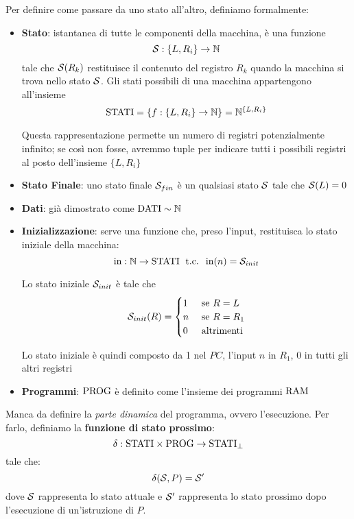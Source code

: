Per definire come passare da uno stato all'altro, definiamo formalmente: 
\begin{itemize}
	\item \textbf{Stato}: istantanea di tutte le componenti della macchina, è una funzione 
	$$ \mathcal{S}: \{L, R_i\} \rightarrow \mathbb{N} $$
	tale che $\mathcal{S} (R_k)$ restituisce il contenuto del registro $R_k$ quando la macchina si trova nello stato $\mathcal{S}$. Gli stati possibili di una macchina appartengono all'insieme 
	$$ \text{STATI} = \{f: \{L, R_i\} \rightarrow \mathbb{N}\} = \mathbb{N}^{\{L,R_i\}} $$
	
    Questa rappresentazione permette un numero di registri potenzialmente infinito; se così non fosse, avremmo tuple per indicare tutti i possibili registri al posto dell'insieme $\{L,R_i\}$

	\item \textbf{Stato Finale}: uno stato finale $\mathcal{S}_{fin}$ è un qualsiasi stato $\mathcal{S}$ tale che $\mathcal{S} (L) = 0$
	
    \item \textbf{Dati}: già dimostrato come $\text{DATI} \sim \mathbb{N}$
	
    \item \textbf{Inizializzazione}: serve una funzione che, preso l'input, restituisca lo stato iniziale della macchina: 
	$$ \text{in}: \mathbb{N} \rightarrow \text{STATI} \; \text{ t.c. } \; \text{in}(n) = \mathcal{S}_{init}$$
    
	Lo stato iniziale $\mathcal{S}_{init}$ è tale che
	$$ 
	\mathcal{S}_{init} (R) = \begin{cases}
		1 & \text{ se } R=L \\
		n & \text{ se } R=R_1 \\
		0 & \text{ altrimenti}
	\end{cases}
	$$
    
    Lo stato iniziale è quindi composto da 1 nel $PC$, l'input $n$ in $R_1$, 0 in tutti gli altri registri
	
    \item \textbf{Programmi}: $\text{PROG}$ è definito come l'insieme dei programmi $\text{RAM}$
\end{itemize}

Manca da definire la \textit{parte dinamica} del programma, ovvero l'esecuzione. Per farlo, definiamo la \textbf{funzione di stato prossimo}: 
$$ \delta : \text{STATI} \times \text{PROG} \rightarrow \text{STATI}_\bot $$
tale che:
$$ \delta (\mathcal{S},P) = \mathcal{S}' $$
dove $\mathcal{S}$ rappresenta lo stato attuale e $\mathcal{S}'$ rappresenta lo stato prossimo dopo l'esecuzione di un'istruzione di $P$.

